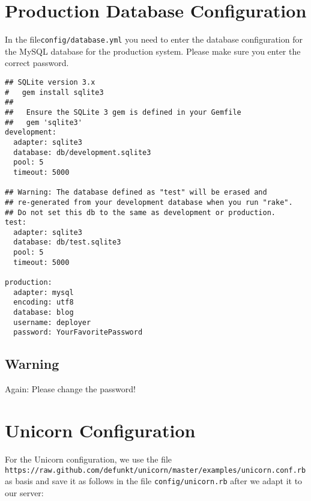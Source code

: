 \documentclass[a4paper]{book}
\newcounter{tab}[chapter]
\begin{document}
\section{Production Database Configuration}\label{production-database-configuration}

In the file\texttt{config/database.yml} you need to enter the database configuration for the MySQL database for the production system. Please make sure you enter the correct password.

\begin{shaded}\begin{verbatim}
## SQLite version 3.x
#   gem install sqlite3
##
##   Ensure the SQLite 3 gem is defined in your Gemfile
##   gem 'sqlite3'
development:
  adapter: sqlite3
  database: db/development.sqlite3
  pool: 5
  timeout: 5000

## Warning: The database defined as "test" will be erased and
## re-generated from your development database when you run "rake".
## Do not set this db to the same as development or production.
test:
  adapter: sqlite3
  database: db/test.sqlite3
  pool: 5
  timeout: 5000

production:
  adapter: mysql
  encoding: utf8
  database: blog
  username: deployer
  password: YourFavoritePassword
\end{verbatim}\end{shaded}

\subsection{Warning}\label{warning-18}

Again: Please change the password!

\section{Unicorn Configuration}\label{unicorn-configuration}

For the Unicorn configuration, we use the file \texttt{https://raw.github.com/defunkt/unicorn/master/examples/unicorn.conf.rb} as basis and save it as follows in the file \texttt{config/unicorn.rb} after we adapt it to our server:
\end{document}
